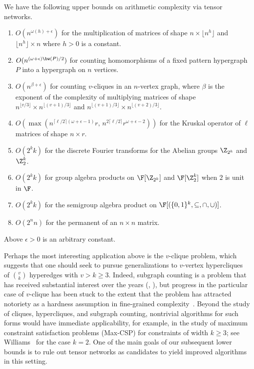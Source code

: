 \begin{theorem}
  \label{thm:upper bounds}
  We have the following upper bounds on arithmetic complexity via tensor
networks. %
  \begin{enumerate}
  \item $O(n^{\omega(h) + \epsilon})$ for the multiplication of matrices of shape $n \times \lfloor n^h \rfloor$ and $\lfloor n^h \rfloor \times n$
where $h > 0$ is a constant. %
%
  \item $O(n^{(\omega+\epsilon) \bw(P)/2})$ for counting homomorphisms of a fixed pattern hypergraph $P$ into a hypergraph on $n$ vertices.
  \item $O(n^{\beta + \epsilon})$ for counting $v$-cliques in an $n$-vertex graph, where $\beta$ is the exponent of the complexity of multiplying matrices of shape $n^{\lfloor v/3 \rfloor} \times n^{\lfloor (v+1)/3 \rfloor}$ and $n^{\lfloor (v+1)/3 \rfloor} \times n^{\lfloor (v+2)/3 \rfloor}$.
  \item $O(\max(n^{\lceil\ell/2\rceil(\omega+\epsilon-1)}r,\,n^{2\lceil\ell/2\rceil}r^{\omega+\epsilon-2}))$ for the Kruskal operator of $\ell$ matrices of shape $n\times r$.
  \item $O(2^k k)$ for the discrete Fourier transforms for the Abelian groups $\Z_{2^k}$ and $\Z_2^k$.
  \item $O(2^kk)$ for group algebra products on $\F[\Z_{2^k}]$ and $\F[\Z_2^k]$ when $2$ is unit in $\F$.
  \item $O(2^kk)$ for the semigroup algebra product on $\F[(\{0,1\}^k,\subseteq,\cap,\cup)]$.
  \item $O(2^n n)$ for the permanent of an $n \times n$ matrix.
  \end{enumerate}
Above $\epsilon>0$ is an arbitrary constant.
\end{theorem}


Perhaps the most interesting application above
is the $v$-clique problem, which suggests that one should seek to
pursue generalizations to $v$-vertex hypercliques of
$\binom{v}{k}$ hyperedges with $v>k\geq 3$.
Indeed, subgraph counting is a problem that has received substantial
interest over the years (\eg, \cite{%
ItaiR1978,%
Nesetril1985,%
AlonYZ1997,%
AlonG2010,%
EisenbrandG2004,%
BjorklundHKK2009,%
BjorklundKK2014,%
WilliamsWWY15,%
WilliamsW2013,%
FominLRSR2012,%
FloderusKLL2015,%
Olariu1988,%
KloksKM2000,%
CurticapeanDM2017}), but progress in the particular case of $v$-clique
has been stuck to the extent that the problem has attracted notoriety as
a hardness assumption in fine-grained
complexity~\cite{AbboudBBK2017,AbboudBW15a}.
Beyond the study of cliques, hypercliques, and subgraph counting, nontrivial
algorithms for such forms would have immediate applicability, for example,
in the study of maximum constraint satisfaction problems (Max-CSP) for
constraints of width $k\geq 3$; 
see Williams~\cite{Williams2005} %
for
the case $k=2$. One of the main goals of our subsequent lower bounds is
to rule out tensor networks as %
candidates  %
to yield improved algorithms in this setting.

